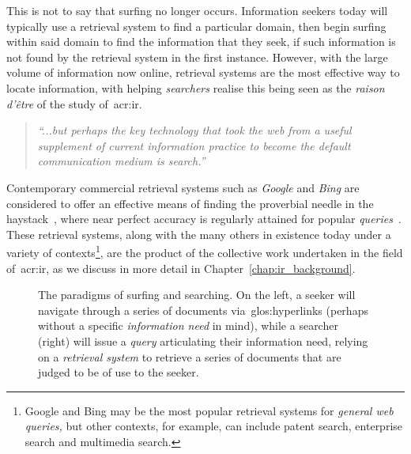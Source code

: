 This is not to say that surfing no longer occurs. Information seekers today will typically use a retrieval system to find a particular domain, then begin surfing within said domain to find the information that they seek, if such information is not found by the retrieval system in the first instance. However, with the large volume of information now online, retrieval systems are the most effective way to locate information, with helping \emph{searchers} realise this being seen as the \emph{raison d'\^{e}tre} of the study of~\gls{acr:ir}.

\begin{quote}
    \emph{``...but perhaps the key technology that took the web from a useful supplement of current information practice to become the default communication medium is search.''}
\end{quote}

Contemporary commercial retrieval systems such as \emph{Google} and \emph{Bing} are considered to offer an effective means of finding the proverbial needle in the haystack~\citep{wilson2010keyword_search}, where near perfect accuracy is regularly attained for popular \emph{queries}~\citep{vaughan2004new_measurements}. These retrieval systems, along with the many others in existence today under a variety of contexts\footnote{Google and Bing may be the most popular retrieval systems for \emph{general web queries,} but other contexts, for example, can include patent search, enterprise search and multimedia search.}, are the product of the collective work undertaken in the field of~\gls{acr:ir}, as we discuss in more detail in Chapter~\ref{chap:ir_background}.

\begin{figure}[t!]
    \centering
    \caption[Surfing vs. searching: illustrations of the two paradigms]{The paradigms of surfing and searching. On the left, a seeker will navigate through a series of documents via~\glspl{glos:hyperlink} (perhaps without a specific \emph{information need} in mind), while a searcher (right) will issue a \emph{query} articulating their information need, relying on a \emph{retrieval system} to retrieve a series of documents that are judged to be of use to the seeker.}
    \label{fig:ch1-surfing}
\end{figure}

